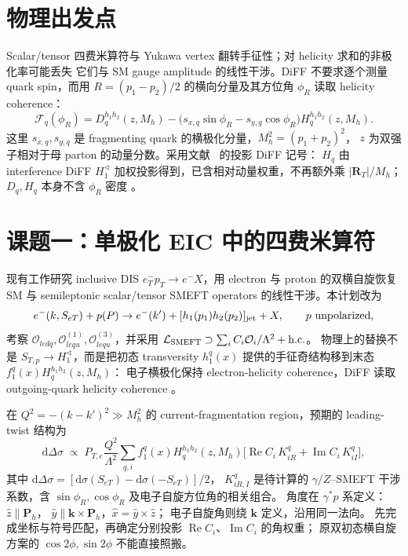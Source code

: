 \documentclass[UTF8,a4paper,zihao=-4,fontset=fandol]{ctexart}
\newcommand{\HT}{H_{1}^{\sphericalangle}}
\newcommand{\dd}{\mathrm d}
\begin{document}
\section{物理出发点}

Scalar/tensor 四费米算符与 Yukawa vertex 翻转手征性；对 helicity 求和的非极化率可能丢失
它们与 SM gauge amplitude 的线性干涉。DiFF 不要求逐个测量 quark spin，而用
\(R=(p_1-p_2)/2\) 的横向分量及其方位角 \(\phi_R\) 读取 helicity coherence：
\begin{equation}
 \mathcal F_q(\phi_R)=D_q^{h_1h_2}(z,M_h)
 -\bigl(s_{x,q}\sin\phi_R-s_{y,q}\cos\phi_R\bigr)H_q^{h_1h_2}(z,M_h).
 \label{eq:analyzer}
\end{equation}
这里 \(s_{x,q},s_{y,q}\) 是 fragmenting quark 的横极化分量，\(M_h^2=(p_1+p_2)^2\)，
\(z\) 为双强子相对于母 parton 的动量分数。采用文献~\cite{Cao:2025wfg} 的投影 DiFF 记号：
\(H_q\) 由 interference DiFF \(\HT\) 加权投影得到，已含相对动量权重，不再额外乘
\(|\bm R_T|/M_h\)；\(D_q,H_q\) 本身不含 \(\phi_R\) 密度
\cite{Cocuzza:2023vqs,Pitonyak:2023gjx}。

\section{课题一：单极化 EIC 中的四费米算符}

现有工作研究 inclusive DIS \(e_T^-p_T\to e^-X\)，用 electron 与 proton 的双横自旋恢复 SM 与
semileptonic scalar/tensor SMEFT operators 的线性干涉\cite{Wang:2024zns}。本计划改为
\[
 e^-(k,S_{eT})+p(P)\to e^-(k')+
 [h_1(p_1)h_2(p_2)]_{\rm jet}+X,
 \qquad p\ {\rm unpolarized},
\]
考察 \(\mathcal O_{ledq},\mathcal O_{lequ}^{(1)},\mathcal O_{lequ}^{(3)}\)，并采用
\(\mathcal L_{\rm SMEFT}\supset\sum_i C_i\mathcal O_i/\Lambda^2+{\rm h.c.}\)。
物理上的替换不是 \(S_{T,p}\to\HT\)，而是把初态 transversity
\(h_1^q(x)\) 提供的手征奇结构移到末态 \(f_1^q(x)H_q^{h_1h_2}(z,M_h)\)：
电子横极化保持 electron-helicity coherence，DiFF 读取 outgoing-quark helicity coherence
\cite{Wen:2024cfu}。

在 \(Q^2=-(k-k')^2\gg M_h^2\) 的 current-fragmentation region，预期的 leading-twist 结构为
\[
 \dd\Delta\sigma\;\propto\;
 P_{T,e}\frac{Q^2}{\Lambda^2}
 \sum_{q,i} f_1^q(x)H_q^{h_1h_2}(z,M_h)
 \bigl[\operatorname{Re}C_i\,K_{iR}^q+
       \operatorname{Im}C_i\,K_{iI}^q\bigr],
\]
其中 \(\dd\Delta\sigma=[\dd\sigma(S_{eT})-\dd\sigma(-S_{eT})]/2\)，
\(K_{iR,I}^q\) 是待计算的 \(\gamma/Z\)--SMEFT 干涉系数，含
\(\sin\phi_R,\cos\phi_R\) 及电子自旋方位角的相关组合。
角度在 \(\gamma^*p\) 系定义：\(\hat z\parallel\bm P_h\)，
\(\hat y\parallel\bm k\times\bm P_h\)，\(\hat x=\hat y\times\hat z\)；
电子自旋角则绕 \(\bm k\) 定义，沿用同一法向。
先完成坐标与符号匹配，再确定分别投影 \(\operatorname{Re}C_i\)、\(\operatorname{Im}C_i\) 的角权重；
原双初态横自旋方案的 \(\cos2\phi,\sin2\phi\) 不能直接照搬。
\end{document}

